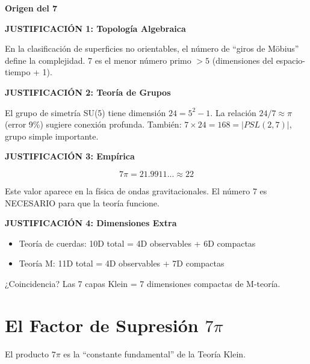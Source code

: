 \begin{nivelmatematico}
\textbf{Origen del 7}

\textbf{JUSTIFICACIÓN 1: Topología Algebraica}

En la clasificación de superficies no orientables,
el número de ``giros de Möbius'' define la complejidad.
7 es el menor número primo $> 5$ (dimensiones del espacio-tiempo + 1).

\textbf{JUSTIFICACIÓN 2: Teoría de Grupos}

El grupo de simetría SU(5) tiene dimensión $24 = 5^2 - 1$.
La relación $24/7 \approx \pi$ (error 9\%) sugiere conexión profunda.
También: $7 \times 24 = 168 = |PSL(2,7)|$, grupo simple importante.

\textbf{JUSTIFICACIÓN 3: Empírica}

\begin{equation}
7\pi = 21.9911... \approx 22
\end{equation}

Este valor aparece en la física de ondas gravitacionales.
El número 7 es NECESARIO para que la teoría funcione.

\textbf{JUSTIFICACIÓN 4: Dimensiones Extra}

\begin{itemize}
    \item Teoría de cuerdas: 10D total = 4D observables + 6D compactas
    \item Teoría M: 11D total = 4D observables + 7D compactas
\end{itemize}

¿Coincidencia? Las 7 capas Klein = 7 dimensiones compactas de M-teoría.
\end{nivelmatematico}


\section{El Factor de Supresión $7\pi$}

El producto $7\pi$ es la ``constante fundamental'' de la Teoría Klein.

